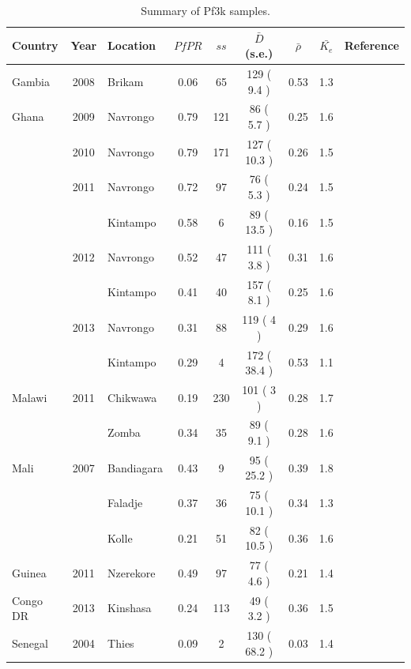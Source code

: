 \documentclass[9pt,lineno]{elife}
\begin{document}
\begin{table}[btp]
  \caption{Summary of Pf3k samples.}\label{tab:Pf3k}
{\small
\begin{tabular}{p{1.3cm} c p{1.8cm} c | c c c c p{2.7cm}}
\hline
\hline
Country         &   Year  &Location  & $PfPR$ & $ss$   & $\bar{D}$ (s.e.)  & $\bar{\rho}$ & $\bar{K_e}$& Reference\\
\hline
Gambia          &    2008 & Brikam   & 0.06   & 65     & 129 ( 9.4 )  & 0.53 & 1.3 &\citet{Amambua-Ngwa2012}\\
\hline
Ghana           &    2009 & Navrongo & 0.79 & 121 & 86 ( 5.7 )& 0.25 & 1.6&\multirow{3}{*}{\parbox{3.4cm}{\citet{Duffy2015,Kamau2015,eLife2016}}}\\
                & 2010 & Navrongo & 0.79 & 171 & 127 ( 10.3 )& 0.26 & 1.5 &\\
                & 2011 & Navrongo & 0.72 & 97 & 76 ( 5.3 )& 0.24 & 1.5& \\
                &      & Kintampo & 0.58 & 6 & 89 ( 13.5 )& 0.16 & 1.5&\\
                & 2012 & Navrongo & 0.52 & 47 & 111 ( 3.8 )& 0.31 & 1.6&\\
                &      & Kintampo & 0.41 & 40 & 157 ( 8.1 )& 0.25 & 1.6&\\
                & 2013 & Navrongo & 0.31 & 88 & 119 ( 4 )& 0.29 & 1.6&\\
                &      & Kintampo & 0.29 & 4 & 172 ( 38.4 )& 0.53 & 1.1&\\
\hline
Malawi & 2011 & Chikwawa & 0.19 & 230 & 101 ( 3 )& 0.28 & 1.7 &\citet{Ocholla2014}\\
       &      & Zomba & 0.34 & 35 & 89 ( 9.1 )& 0.28 & 1.6 &\\
\hline
Mali & 2007 & Bandiagara & 0.43 & 9 & 95 ( 25.2 )& 0.39 & 1.8  &\multirow{3}{*}{\parbox{3.4cm}{\citet{Mobegi2014,eLife2016}}}\\
     &      & Faladje & 0.37 & 36 & 75 ( 10.1 )& 0.34 & 1.3 &\\
     &      & Kolle & 0.21 & 51 & 82 ( 10.5 )& 0.36 & 1.6 &\\
\cline{1-8}
Guinea & 2011 & Nzerekore & 0.49 & 97 & 77 ( 4.6 )& 0.21 & 1.4 &\\
\cline{1-8}
Congo DR        & 2013 & Kinshasa & 0.24 & 113 & 49 ( 3.2 )& 0.36 & 1.5\\
\hline
Senegal & 2004 & Thies & 0.09 & 2 & 130 ( 68.2 )& 0.03 & 1.4  &\citet{Wong2017}\\

\end{tabular}}
\end{table}
\end{document}
